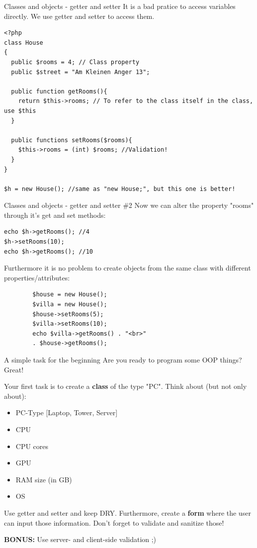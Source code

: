 \begin{frame}[fragile]{Classes and objects - getter and setter}
	It is a bad pratice to access variables directly. We use getter and setter to access them. \pause
	\begin{lstlisting}
<?php
class House
{
  public $rooms = 4; // Class property
  public $street = "Am Kleinen Anger 13";
  
  public function getRooms(){
  	return $this->rooms; // To refer to the class itself in the class, use $this
  }
  
  public functions setRooms($rooms){
  	$this->rooms = (int) $rooms; //Validation!
  }
}

$h = new House(); //same as "new House;", but this one is better!
\end{lstlisting}
\end{frame}

\begin{frame}[fragile]{Classes and objects - getter and setter \#{}2}
	Now we can alter the property "rooms" through it's get and set methods:\pause
	\begin{lstlisting}
echo $h->getRooms(); //4
$h->setRooms(10);
echo $h->getRooms(); //10
\end{lstlisting}\pause
	Furthermore it is no problem to create objects from the same class with different properties/attributes:\pause
		\begin{lstlisting}
		$house = new House();
		$villa = new House();
		$house->setRooms(5);
		$villa->setRooms(10);
		echo $villa->getRooms() . "<br>" 
		. $house->getRooms();
		\end{lstlisting}
\end{frame}

\begin{frame}[fragile]{A simple task for the beginning}
	Are you ready to program some OOP things? Great! \pause
	
	Your first task is to create a \textbf{class} of the type "PC". Think about (but not only about): 
	\begin{itemize}
	\item PC-Type [Laptop, Tower, Server] \pause
	\item CPU \pause
	\item CPU cores \pause
	\item GPU \pause
	\item RAM size (in GB) \pause
	\item OS \pause
	\end{itemize}
	
	Use getter and setter and keep DRY. \pause
	Furthermore, create a \textbf{form} where the user can input those information. Don't forget to validate and sanitize those! \pause
	
	\textbf{BONUS:} Use server- and client-side validation ;)
\end{frame}

